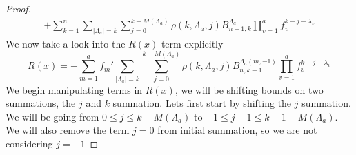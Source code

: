 \documentclass[11pt]{article}
\theoremstyle{plain}
\theoremstyle{definition}
\begin{document}
\begin{proof}
\begin{align*}
+ \sum_{k=1}^n \sum_{|\Lambda_a|=k} \sum_{j=0}^{k-M(\Lambda_a)}\rho(k,\Lambda_a,j)B_{n+1,k}^{\Lambda_a} \prod_{v=1}^a f_v^{k-j-\lambda_v} \tag{P.2}
\end{align*}
We now take a look into the $R(x)$ term explicitly
\begin{equation*}
    R(x) = -\sum_{m=1}^af_m'\sum_{|\Lambda_a|=k} \sum_{j=0}^{k-M(\Lambda_a)}\rho(k,\Lambda_a,j)B_{n,k-1}^{\Lambda_a(m,-1)} \prod_{v=1}^a f_v^{k-j-\lambda_v}
\end{equation*}
We begin manipulating terms in $R(x)$, we will be shifting bounds on two summations, the $j$ and $k$ summation. Lets first start by shifting the $j$ summation. We will be going from $0 \le j \le k-M(\Lambda_a)$ to $-1 \le j-1 \le k-1-M(\Lambda_a)$. We will also remove the term $j=0$ from initial summation, so we are not considering $j=-1$


\end{proof}
\end{document}

